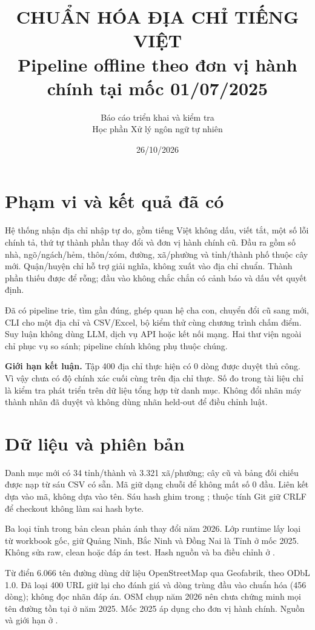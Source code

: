 \documentclass[12pt,a4paper]{article}
\title{\textbf{CHUẨN HÓA ĐỊA CHỈ TIẾNG VIỆT}\\[6pt]\large Pipeline offline theo đơn vị hành chính tại mốc 01/07/2025}
\author{Báo cáo triển khai và kiểm tra\\Học phần Xử lý ngôn ngữ tự nhiên}
\date{26/10/2026}
\begin{document}
\maketitle
\section{Phạm vi và kết quả đã có}
Hệ thống nhận địa chỉ nhập tự do, gồm tiếng Việt không dấu, viết tắt, một số lỗi chính tả, thứ tự thành phần thay đổi và đơn vị hành chính cũ. Đầu ra gồm số nhà, ngõ/ngách/hẻm, thôn/xóm, đường, xã/phường và tỉnh/thành phố thuộc cây mới. Quận/huyện chỉ hỗ trợ giải nghĩa, không xuất vào địa chỉ chuẩn. Thành phần thiếu được để rỗng; đầu vào không chắc chắn có cảnh báo và dấu vết quyết định.

Đã có pipeline trie, tìm gần đúng, ghép quan hệ cha con, chuyển đổi cũ sang mới, CLI cho một địa chỉ và CSV/Excel, bộ kiểm thử cùng chương trình chấm điểm. Suy luận không dùng LLM, dịch vụ API hoặc kết nối mạng. Hai thư viện ngoài chỉ phục vụ so sánh; pipeline chính không phụ thuộc chúng.

\textbf{Giới hạn kết luận.} Tập 400 địa chỉ thực hiện có 0 dòng được duyệt thủ công. Vì vậy chưa có độ chính xác cuối cùng trên địa chỉ thực. Số đo trong tài liệu chỉ là kiểm tra phát triển trên dữ liệu tổng hợp từ danh mục. Không đổi nhãn máy thành nhãn đã duyệt và không dùng nhãn held-out để điều chỉnh luật.

\section{Dữ liệu và phiên bản}
Danh mục mới có 34 tỉnh/thành và 3.321 xã/phường; cây cũ và bảng đối chiếu được nạp từ sáu CSV có sẵn. Mã giữ dạng chuỗi để không mất số 0 đầu. Liên kết dựa vào mã, không dựa vào tên. Sáu hash ghim trong ; thuộc tính Git giữ CRLF để checkout không làm sai hash byte.

Ba loại tỉnh trong bản clean phản ánh thay đổi năm 2026. Lớp runtime lấy loại từ workbook gốc, giữ Quảng Ninh, Bắc Ninh và Đồng Nai là Tỉnh ở mốc 2025. Không sửa raw, clean hoặc đáp án test. Hash nguồn và ba điều chỉnh ở .

Từ điển 6.066 tên đường dùng dữ liệu OpenStreetMap qua Geofabrik, theo ODbL 1.0. Đã loại 400 URL giữ lại cho đánh giá và dòng trùng đầu vào chuẩn hóa (456 dòng); không đọc nhãn đáp án. OSM chụp năm 2026 nên chưa chứng minh mọi tên đường tồn tại ở năm 2025. Mốc 2025 áp dụng cho đơn vị hành chính. Nguồn và giới hạn ở .
\end{document}
